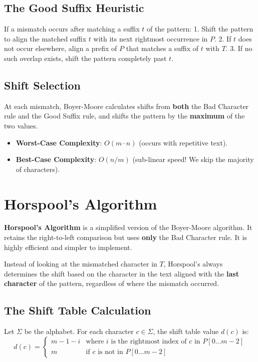 \documentclass[11pt,a4paper]{article}
\begin{document}
\subsection{The Good Suffix Heuristic}
If a mismatch occurs after matching a suffix $t$ of the pattern:
1. Shift the pattern to align the matched suffix $t$ with its next rightmost occurrence in $P$.
2. If $t$ does not occur elsewhere, align a prefix of $P$ that matches a suffix of $t$ with $T$.
3. If no such overlap exists, shift the pattern completely past $t$.

\subsection{Shift Selection}
At each mismatch, Boyer-Moore calculates shifts from \textbf{both} the Bad Character rule and the Good Suffix rule, and shifts the pattern by the \textbf{maximum} of the two values.
\begin{itemize}
  \item \textbf{Worst-Case Complexity}: $O(m \cdot n)$ (occurs with repetitive text).
  \item \textbf{Best-Case Complexity}: $O(n / m)$ (sub-linear speed! We skip the majority of characters).
\end{itemize}

\section{Horspool's Algorithm}

\textbf{Horspool's Algorithm} is a simplified version of the Boyer-Moore algorithm. It retains the right-to-left comparison but uses \textbf{only} the Bad Character rule. It is highly efficient and simpler to implement.

Instead of looking at the mismatched character in $T$, Horspool's always determines the shift based on the character in the text aligned with the \textbf{last character} of the pattern, regardless of where the mismatch occurred.

\subsection{The Shift Table Calculation}
Let $\Sigma$ be the alphabet. For each character $c \in \Sigma$, the shift table value $d(c)$ is:
\begin{equation}
  d(c) = \begin{cases}
    m - 1 - i & \text{where } i \text{ is the rightmost index of } c \text{ in } P[0 \dots m-2] \\
    m         & \text{if } c \text{ is not in } P[0 \dots m-2]
  \end{cases}
\end{equation}
\end{document}

